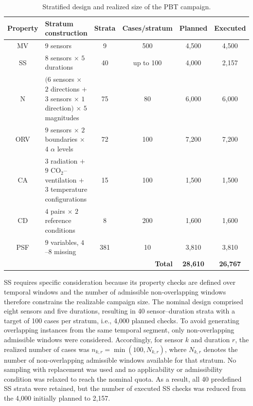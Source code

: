 \documentclass[preprint,12pt]{elsarticle}
\begin{document}
\begin{table}[!t]
\centering
\caption{Stratified design and realized size of the PBT campaign.}
\label{tab:pbt_campaign_design}
\scriptsize
\setlength{\tabcolsep}{2pt}
\renewcommand{\arraystretch}{1.15}

\begin{tabular}{|c|p{4.0cm}|c|c|c|c|}
\hline
\textbf{Property} &
\centering\arraybackslash\textbf{Stratum construction} &
\textbf{Strata} &
\textbf{Cases/stratum} &
\textbf{Planned} &
\textbf{Executed} \\
\hline

MV &
\(9\) sensors &
9 & 500 & 4,500 & 4,500 \\
\hline

SS &
\(8\) sensors \(\times\) \(5\) durations &
40 & up to 100 & 4,000 & 2,157 \\
\hline

N &
\((6\) sensors \(\times\) \(2\) directions \(+\)
\(3\) sensors \(\times\) \(1\) direction\()\)
\(\times\) \(5\) magnitudes &
75 & 80 & 6,000 & 6,000 \\
\hline

ORV &
\(9\) sensors \(\times\) \(2\) boundaries
\(\times\) \(4\) \(\alpha\) levels &
72 & 100 & 7,200 & 7,200 \\
\hline

CA &
\(3\) radiation \(+\) \(9\) CO$_2$--ventilation \(+\)
\(3\) temperature configurations &
15 & 100 & 1,500 & 1,500 \\
\hline

CD &
\(4\) pairs \(\times\) \(2\) reference conditions &
8 & 200 & 1,600 & 1,600 \\
\hline

PSF &
\(9\) variables, \(4\)--\(8\) missing &
381 & 10 & 3,810 & 3,810 \\
\hline

\multicolumn{4}{|r|}{\textbf{Total}} &
\textbf{28,610} &
\textbf{26,767} \\
\hline
\end{tabular}
\end{table}


SS requires specific consideration because its property checks are defined
over temporal windows and the number of admissible non-overlapping windows
therefore constrains the realizable campaign size. The nominal design
comprised eight sensors and five durations, resulting in 40 sensor--duration
strata with a target of 100 cases per stratum, i.e., 4,000 planned checks.
To avoid generating overlapping instances from the same temporal segment,
only non-overlapping admissible windows were considered. Accordingly, for
sensor \(k\) and duration \(r\), the realized number of cases was
\(n_{k,r}=\min(100,N_{k,r})\), where \(N_{k,r}\) denotes the number of
non-overlapping admissible windows available for that stratum. No sampling
with replacement was used and no applicability or admissibility condition
was relaxed to reach the nominal quota. As a result, all 40 predefined SS
strata were retained, but the number of executed SS checks was reduced from
the 4,000 initially planned to 2,157.
\end{document}
